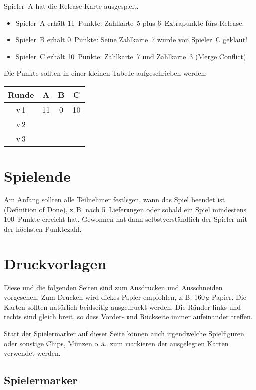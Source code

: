 \documentclass[DIV=15, fontsize=11pt]{gitgame}
\begin{document}
Spieler~A hat die Release-Karte ausgespielt.
\begin{itemize}
	\item Spieler~A erhält 11~Punkte: Zahlkarte~5 plus 6~Extrapunkte fürs Release.
	\item Spieler~B erhält 0~Punkte: Seine Zahlkarte~7 wurde von Spieler~C geklaut!
	\item Spieler~C erhält 10~Punkte: Zahlkarte~7 und Zahlkarte~3 (Merge Conflict).
\end{itemize}

Die Punkte sollten in einer kleinen Tabelle aufgeschrieben werden:

\begin{center}
\begin{tabular}{c|c|c|c}
	Runde & A & B & C \\
	\hline
	v\,1 & 11 & 0 & 10 \\
	\hline
	v\,2 &  & & \\
	\hline
	v\,3 &  & & \\
\end{tabular}
\end{center}



\section{Spielende\label{ende}}
Am Anfang sollten alle Teilnehmer festlegen, wann das Spiel beendet ist (Definition of Done), z.\,B. nach 5~Lieferungen oder sobald ein Spiel mindestens 100~Punkte erreicht hat. Gewonnen hat dann selbstverständlich der Spieler mit der höchsten Punktezahl.



\clearpage
\section{Druckvorlagen}
Diese und die folgenden Seiten sind zum Ausdrucken und Ausschneiden vorgesehen. Zum Drucken wird dickes Papier empfohlen, z.\,B. 160\,g-Papier. Die Karten sollten natürlich beidseitig ausgedruckt werden. Die Ränder links und rechts sind gleich breit, so dass Vorder- und Rückseite immer aufeinander treffen.

Statt der Spielermarker auf dieser Seite können auch irgendwelche Spielfiguren oder sonstige Chips, Münzen o.\,ä.\ zum markieren der ausgelegten Karten verwendet werden.

\subsection*{Spielermarker}
\end{document}
